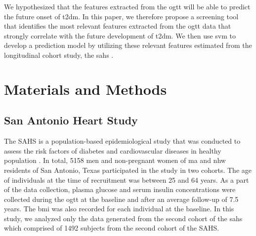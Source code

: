 \documentclass[journal,comsoc]{IEEEtran}
\renewcommand{\^}{\hat}  %
\begin{document}
We hypothesized that the features extracted from the \ac{ogtt} will be able to predict the future onset of \ac{t2dm}. In this paper, we therefore propose a screening tool that identifies the most relevant features extracted from the \ac{ogtt} data that strongly correlate with the future development of \ac{t2dm}. We then use \ac{svm} to develop a prediction model by utilizing these relevant features estimated from the longitudinal cohort study, the \ac{sahs} \cite{burke_rapid_1999,lorenzo_trend_2006}.
%
\section{Materials and Methods}
%
\subsection{San Antonio Heart Study}
%
The SAHS is a population-based epidemiological study that was conducted to assess the risk factors of diabetes and cardiovascular diseases in healthy population \cite{burke_rapid_1999,lorenzo_trend_2006}. In total, \num[group-minimum-digits=4, group-separator = {,}]{5158} men and non-pregnant women of \ac{ma} and \ac{nhw} residents of San Antonio, Texas participated in the study in two cohorts. The age of individuals at the time of recruitment was between \num{25} and \num{64} years. As a part of the data collection, plasma glucose and serum insulin concentrations were collected during the \ac{ogtt} at the baseline and after an average follow-up of \num{7.5} years. The \ac{bmi} was also recorded for each individual at the baseline. In this study, we analyzed only the data generated from the second cohort of the \ac{sahs} which comprised of \num[group-minimum-digits=4, group-separator = {,}]{1492} subjects from the second cohort of the SAHS.
\end{document}
